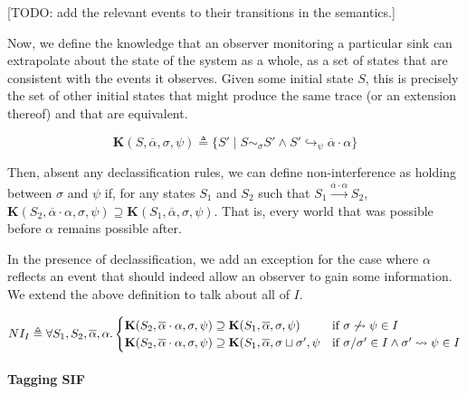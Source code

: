 \documentclass[acmsmall,review,anonymous]{acmart}\settopmatter{printfolios=true,printccs=false,printacmref=false}
\begin{document}
[TODO: add the relevant events to their transitions in the semantics.]

Now, we define the knowledge that an observer monitoring a particular sink can extrapolate about the
state of the system as a whole, as a set of states that are consistent with the events it observes.
Given some initial state \(S\), this is precisely the set of other initial states that might
produce the same trace (or an extension thereof) and that are equivalent.

\[\mathbf{K}(S,\overline{\alpha},\sigma,\psi) \triangleq
\{S' \mid S \sim_\sigma S' \land S' \hookrightarrow_{\psi} \overline{\alpha} \cdot \alpha\}\]

Then, absent any declassification rules, we can define non-interference as holding between
\(\sigma\) and \(\psi\) if, for any states \(S_1\) and \(S_2\) such that
\(S_1 \xrightarrow{\overline{\alpha}\cdot \alpha} S_2\),
\(\mathbf{K}(S_2,\overline{\alpha}\cdot \alpha,\sigma,\psi) \supseteq
\mathbf{K}(S_1,\overline{\alpha},\sigma,\psi)\). That is, every world that was possible before
\(\alpha\) remains possible after.

In the presence of declassification, we add an exception for the case where \(\alpha\)
reflects an event that should indeed allow an observer to gain some information. We extend
the above definition to talk about all of \(I\).

\[NI_I \triangleq \forall S_1, S_2, \overline{\alpha}, \alpha .
\begin{cases}
\mathbf{K}(S_2,\overline{\alpha}\cdot \alpha,\sigma,\psi) \supseteq
\mathbf{K}(S_1,\overline{\alpha},\sigma,\psi) &
\textnormal{if } \sigma \not \rightsquigarrow \psi \in I \\
\mathbf{K}(S_2,\overline{\alpha}\cdot \alpha,\sigma,\psi) \supseteq
\mathbf{K}(S_1,\overline{\alpha},\sigma \sqcup \sigma',\psi &
\textnormal{if } \sigma / \sigma' \in I \land \sigma' \rightsquigarrow \psi \in I \\
\end{cases}\]

\paragraph{Tagging SIF}
\end{document}
